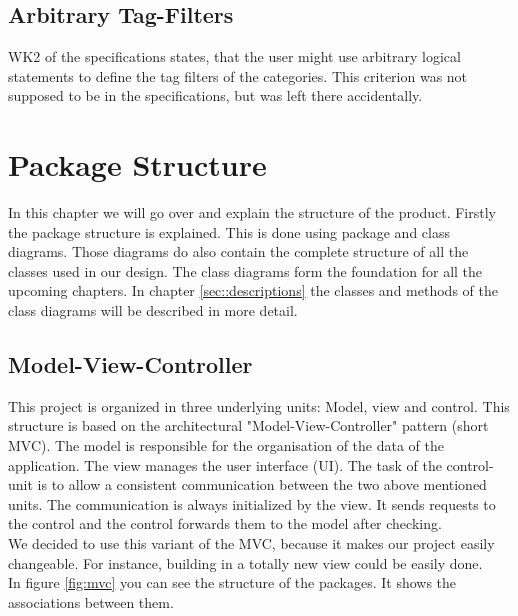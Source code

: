 \documentclass[parskip=full]{scrartcl} %
\begin{document}
\subsection*{Arbitrary Tag-Filters}
WK2 of the specifications states, that the user might use arbitrary logical statements to define the tag filters of the categories. This criterion was not supposed to be in the specifications, but was left there accidentally.

\newpage



\section{Package Structure}
In this chapter we will go over and explain the structure of the product. Firstly the package structure is explained. This is done using package and class diagrams. Those diagrams do also contain the complete structure of all the classes used in our design. The class diagrams form the foundation for all the upcoming chapters. In chapter \ref{sec::descriptions} the classes and methods of the class diagrams will be described in more detail.

\subsection{Model-View-Controller} \label{sec::mvc}
This project is organized in three underlying units: Model, view and control. This structure is based on the architectural "Model-View-Controller" pattern (short MVC). 
The model is responsible for the organisation of the data of the application. The view manages the user interface (UI). The task of the control-unit is to allow a consistent communication between the two above mentioned units. The communication is always initialized by the view. It sends requests to the control and the control forwards them to the model after checking.\\
We decided to use this variant of the MVC, because it makes our project easily changeable. For instance, building in a totally new view could be easily done.\\
In figure \ref{fig:mvc} you can see the structure of the packages. It shows the associations between them.
\end{document}
